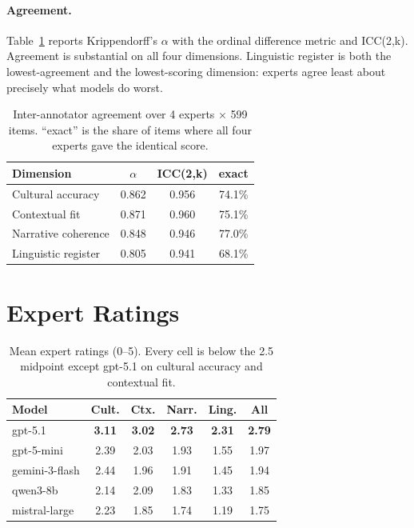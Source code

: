 \documentclass[11pt]{article}
\begin{document}
\paragraph{Agreement.}
Table~\ref{tab:agreement} reports Krippendorff's $\alpha$ with the ordinal
difference metric and ICC(2,k). Agreement is substantial on all four
dimensions. Linguistic register is both the lowest-agreement and the
lowest-scoring dimension: experts agree least about precisely what models do
worst.

\begin{table}[t]
\centering\small
\begin{tabular}{lccc}
\toprule
Dimension & $\alpha$ & ICC(2,k) & exact \\
\midrule
Cultural accuracy    & 0.862 & 0.956 & 74.1\% \\
Contextual fit       & 0.871 & 0.960 & 75.1\% \\
Narrative coherence  & 0.848 & 0.946 & 77.0\% \\
Linguistic register  & 0.805 & 0.941 & 68.1\% \\
\bottomrule
\end{tabular}
\caption{Inter-annotator agreement over 4 experts $\times$ 599 items.
``exact'' is the share of items where all four experts gave the identical
score.}
\label{tab:agreement}
\end{table}

\section{Expert Ratings}
\label{sec:ratings}

\begin{table}[t]
\centering\small
\setlength{\tabcolsep}{3.5pt}
\begin{tabular}{lccccc}
\toprule
Model & Cult. & Ctx. & Narr. & Ling. & All \\
\midrule
gpt-5.1        & \textbf{3.11} & \textbf{3.02} & \textbf{2.73} & \textbf{2.31} & \textbf{2.79} \\
gpt-5-mini     & 2.39 & 2.03 & 1.93 & 1.55 & 1.97 \\
gemini-3-flash & 2.44 & 1.96 & 1.91 & 1.45 & 1.94 \\
qwen3-8b       & 2.14 & 2.09 & 1.83 & 1.33 & 1.85 \\
mistral-large  & 2.23 & 1.85 & 1.74 & 1.19 & 1.75 \\
\bottomrule
\end{tabular}
\caption{Mean expert ratings (0--5). Every cell is below the 2.5 midpoint
except gpt-5.1 on cultural accuracy and contextual fit.}
\label{tab:models}
\end{table}
\end{document}
